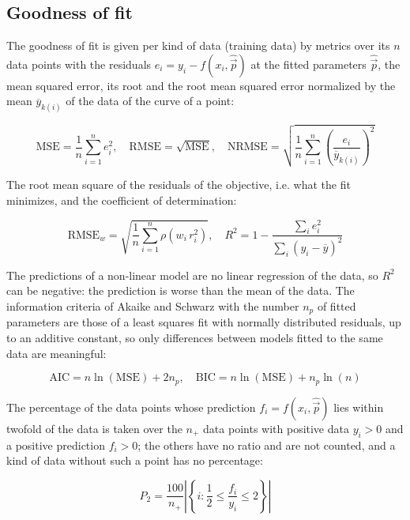 \subsection{Goodness of fit}

The goodness of fit is given per kind of data (training data) by metrics over its $n$ data points with the residuals $e_i = y_i - f(x_i, \hat{\vec{p}})$ at the fitted parameters $\hat{\vec{p}}$, the mean squared error, its root and the root mean squared error normalized by the mean $\overline{y}_{k(i)}$ of the data of the curve of a point:

\begin{equation}
\mathrm{MSE} = \frac{1}{n} \sum_{i=1}^{n} e_i^2, \quad \mathrm{RMSE} = \sqrt{\mathrm{MSE}}, \quad \mathrm{NRMSE} = \sqrt{\frac{1}{n} \sum_{i=1}^{n} \left(\frac{e_i}{\overline{y}_{k(i)}}\right)^2}
\end{equation}

The root mean square of the residuals of the objective, i.e. what the fit minimizes, and the coefficient of determination:

\begin{equation}
\mathrm{RMSE}_w = \sqrt{\frac{1}{n} \sum_{i=1}^{n} \rho\left(w_i\, r_i^2\right)}, \quad R^2 = 1 - \frac{\sum_{i} e_i^2}{\sum_{i} \left(y_i - \overline{y}\right)^2}
\end{equation}

The predictions of a non-linear model are no linear regression of the data, so $R^2$ can be negative: the prediction is worse than the mean of the data. The information criteria of Akaike \cite{Akaike1974} and Schwarz \cite{Schwarz1978} with the number $n_p$ of fitted parameters are those of a least squares fit with normally distributed residuals, up to an additive constant, so only differences between models fitted to the same data are meaningful:

\begin{equation}
\mathrm{AIC} = n \ln(\mathrm{MSE}) + 2 n_p, \quad \mathrm{BIC} = n \ln(\mathrm{MSE}) + n_p \ln(n)
\end{equation}

The percentage of the data points whose prediction $f_i = f(x_i, \hat{\vec{p}})$ lies within twofold of the data is taken over the $n_+$ data points with positive data $y_i > 0$ and a positive prediction $f_i > 0$; the others have no ratio and are not counted, and a kind of data without such a point has no percentage:

\begin{equation}
P_2 = \frac{100}{n_+} \left|\left\{ i : \frac{1}{2} \le \frac{f_i}{y_i} \le 2 \right\}\right|
\end{equation}

